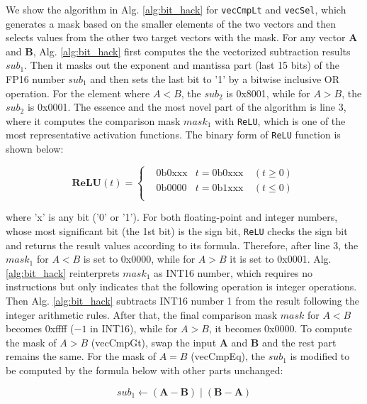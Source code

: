 We show the algorithm in Alg. \ref{alg:bit_hack} for \verb|vecCmpLt| and \verb|vecSel|, which generates a mask based on the smaller elements of the two vectors and then selects values from the other two target vectors with the mask. For any vector \textbf{A} and \textbf{B}, Alg. \ref{alg:bit_hack} first computes the the vectorized subtraction results $sub_{1}$. Then it masks out the exponent and mantissa part (last 15 bits) of the FP16 number $sub_{1}$ and then sets the last bit to '1' by a bitwise inclusive OR operation. For the element where $A < B$, the $sub_{2}$ is 0x8001, while for $A > B$, the $sub_{2}$ is 0x0001. The essence and the most novel part of the algorithm is line 3, where it computes the comparison mask $mask_{1}$ with \verb|ReLU|, which is one of the most representative activation functions. The binary form of \verb|ReLU| function is shown below:

\begin{equation}
    \label{eq:relu}
    \textbf{ReLU}(t) = \left\{
    \begin{aligned}
        &\text{0b0xxx}  &t = \text{0b0xxx} \  &(t \ge 0) \\
        &\text{0b0000} &t = \text{0b1xxx} \  &(t \le 0) \\
    \end{aligned}
    \right.
\end{equation}
    
where 'x' is any bit ('0' or '1'). For both floating-point and integer numbers, whose most significant bit (the 1st bit) is the sign bit, \verb|ReLU| checks the sign bit and returns the result values according to its formula. Therefore, after line 3, the $mask_{1}$ for $A < B$ is set to 0x0000, while for $A > B$ it is set to 0x0001. Alg. \ref{alg:bit_hack} reinterprets $mask_{1}$ as INT16 number, which requires no instructions but only indicates that the following operation is integer operations. Then Alg. \ref{alg:bit_hack} subtracts INT16 number 1 from the result following the integer arithmetic rules. After that, the final comparison mask $mask$ for $A < B$ becomes 0xffff ($-1$ in INT16), while for $A > B$, it becomes 0x0000. To compute the mask of $A > B$ (vecCmpGt), swap the input $\textbf{A}$ and $\textbf{B}$ and the rest part remains the same. For the mask of $A = B$ (vecCmpEq), the $sub_{1}$ is modified to be computed by the formula below with other parts unchanged:

\begin{equation}
    sub_{1} \leftarrow (\textbf{A} - \textbf{B}) \mid (\textbf{B} - \textbf{A})
\end{equation}

